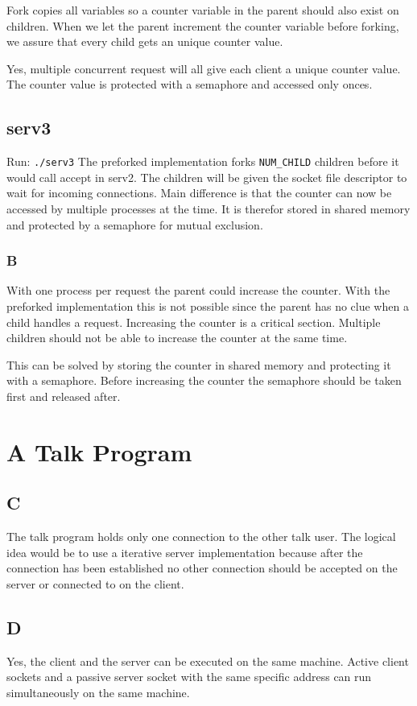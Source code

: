 \documentclass[10pt,a4paper]{article}
\begin{document}
Fork copies all variables so a counter variable in the parent should also exist on children. When we let the parent increment the counter variable before forking, we assure that every child gets an unique counter value. 

Yes, multiple concurrent request will all give each client a unique counter value. The counter value is protected with a semaphore and accessed only onces.

\subsection{serv3}
Run: \texttt{./serv3}
The preforked implementation forks \texttt{NUM\_CHILD} children before it would call accept in serv2. The children will be given the socket file descriptor to wait for incoming connections. Main difference is that the counter can now be accessed by multiple processes at the time. It is therefor stored in shared memory and protected by a semaphore for mutual exclusion.

\subsubsection{B}
With one process per request the parent could increase the counter. With the preforked implementation this is not possible since the parent has no clue when a child handles a request. Increasing the counter is a critical section. Multiple children should not be able to increase the counter at the same time. 

This can be solved by storing the counter in shared memory and protecting it with a semaphore. Before increasing the counter the semaphore should be taken first and released after.



\section{A Talk Program}

\subsection{C}
The talk program holds only one connection to the other talk user. The logical idea would be to use a iterative server implementation because after the connection has been established no other connection should be accepted on the server or connected to on the client.

\subsection{D}
Yes, the client and the server can be executed on the same machine. Active client sockets and a passive server socket with the same specific address can run simultaneously on the same machine.
\end{document}
